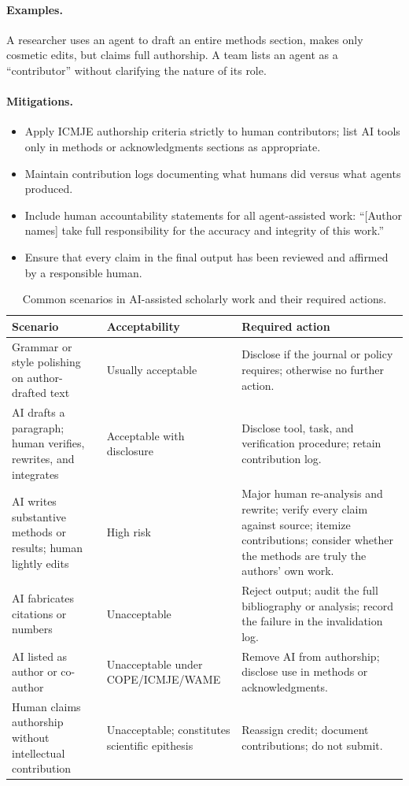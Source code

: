 \documentclass[11pt,letterpaper]{article}
\begin{document}
\paragraph{Examples.} A researcher uses an agent to draft an entire methods section, makes only cosmetic edits, but claims full authorship. A team lists an agent as a ``contributor'' without clarifying the nature of its role.

\paragraph{Mitigations.}
\begin{itemize}[leftmargin=*]
    \item Apply ICMJE authorship criteria strictly to human contributors; list AI tools only in methods or acknowledgments sections as appropriate.
    \item Maintain contribution logs documenting what humans did versus what agents produced.
    \item Include human accountability statements for all agent-assisted work: ``[Author names] take full responsibility for the accuracy and integrity of this work.''
    \item Ensure that every claim in the final output has been reviewed and affirmed by a responsible human.
\end{itemize}

\begin{table}[h]
\centering
\caption{Common scenarios in AI-assisted scholarly work and their required actions.}
\label{tab:authorship-scenarios}
\small
\begin{tabular}{p{4.6cm} p{3.6cm} p{5.4cm}}
\toprule
\textbf{Scenario} & \textbf{Acceptability} & \textbf{Required action} \\
\midrule
Grammar or style polishing on author-drafted text & Usually acceptable & Disclose if the journal or policy requires; otherwise no further action. \\
AI drafts a paragraph; human verifies, rewrites, and integrates & Acceptable with disclosure & Disclose tool, task, and verification procedure; retain contribution log. \\
AI writes substantive methods or results; human lightly edits & High risk & Major human re-analysis and rewrite; verify every claim against source; itemize contributions; consider whether the methods are truly the authors' own work. \\
AI fabricates citations or numbers & Unacceptable & Reject output; audit the full bibliography or analysis; record the failure in the invalidation log. \\
AI listed as author or co-author & Unacceptable under COPE/ICMJE/WAME \cite{cope_ai,icmje_authorship,icmje_ai,wame2023} & Remove AI from authorship; disclose use in methods or acknowledgments. \\
Human claims authorship without intellectual contribution & Unacceptable; constitutes scientific epithesis & Reassign credit; document contributions; do not submit. \\
\bottomrule
\end{tabular}
\end{table}
\end{document}
